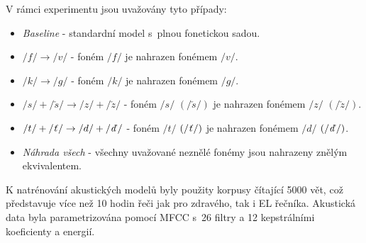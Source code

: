 V rámci experimentu jsou uvažovány tyto případy:

\begin{itemize}
  \item \textit{Baseline} - standardní model s~plnou fonetickou sadou.
  \item $/f/ \rightarrow /v/$ - foném $/f/$ je nahrazen fonémem $/v/$.
  \item $/k/ \rightarrow /g/$ - foném $/k/$ je nahrazen fonémem $/g/$.
  \item $/s/+/\check{s}/ \rightarrow /z/+/\check{z}/$ - foném $/s/$ $\left(/\check{s}/\right)$ je nahrazen fonémem $/z/$ $\left(/\check{z}/\right)$.
  \item $/t/+/\text{\textit{ť}}/ \rightarrow /d/+/\text{\textit{ď}}/$ - foném $/t/$ $\left(/\text{\textit{ť}}/\right)$ je nahrazen fonémem $/d/$ $\left(/\text{\textit{ď}}/\right)$.
  \item \textit{Náhrada všech} - všechny uvažované neznělé fonémy jsou nahrazeny znělým ekvivalentem.
\end{itemize}



K natrénování akustických modelů byly použity korpusy čítající 5000 vět,
což představuje více než 10 hodin řeči jak pro zdravého, tak i EL řečníka.
Akustická data byla parametrizována pomocí MFCC s~26 filtry a 12 kepstrálními koeficienty a energií.


